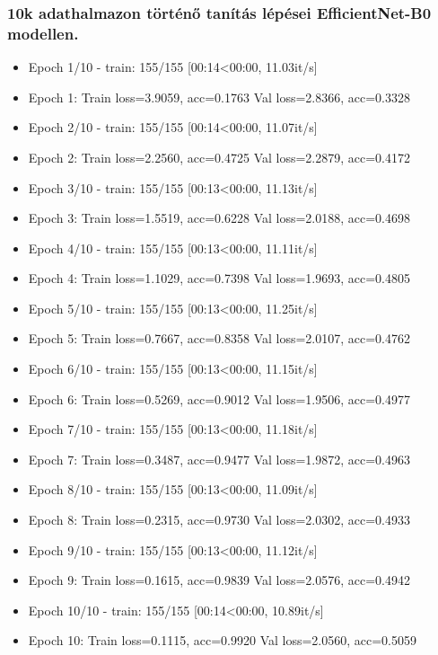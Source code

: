 \subsubsection{10k adathalmazon történő tanítás lépései EfficientNet-B0 modellen.}
  \begin{itemize} 
    \item Epoch 1/10 - train: 155/155 [00:14<00:00, 11.03it/s]
    \item Epoch 1: Train loss=3.9059, acc=0.1763 Val loss=2.8366, acc=0.3328
    \item Epoch 2/10 - train: 155/155 [00:14<00:00, 11.07it/s]
    \item Epoch 2: Train loss=2.2560, acc=0.4725 Val loss=2.2879, acc=0.4172
    \item Epoch 3/10 - train: 155/155 [00:13<00:00, 11.13it/s]
    \item Epoch 3: Train loss=1.5519, acc=0.6228 Val loss=2.0188, acc=0.4698
    \item Epoch 4/10 - train: 155/155 [00:13<00:00, 11.11it/s]
    \item Epoch 4: Train loss=1.1029, acc=0.7398 Val loss=1.9693, acc=0.4805
    \item Epoch 5/10 - train: 155/155 [00:13<00:00, 11.25it/s]
    \item Epoch 5: Train loss=0.7667, acc=0.8358 Val loss=2.0107, acc=0.4762
    \item Epoch 6/10 - train: 155/155 [00:13<00:00, 11.15it/s]
    \item Epoch 6: Train loss=0.5269, acc=0.9012 Val loss=1.9506, acc=0.4977
    \item Epoch 7/10 - train: 155/155 [00:13<00:00, 11.18it/s]
    \item Epoch 7: Train loss=0.3487, acc=0.9477 Val loss=1.9872, acc=0.4963
    \item Epoch 8/10 - train: 155/155 [00:13<00:00, 11.09it/s]
    \item Epoch 8: Train loss=0.2315, acc=0.9730 Val loss=2.0302, acc=0.4933
    \item Epoch 9/10 - train: 155/155 [00:13<00:00, 11.12it/s]
    \item Epoch 9: Train loss=0.1615, acc=0.9839 Val loss=2.0576, acc=0.4942
    \item Epoch 10/10 - train: 155/155 [00:14<00:00, 10.89it/s]
    \item Epoch 10: Train loss=0.1115, acc=0.9920 Val loss=2.0560, acc=0.5059
  \end{itemize}

